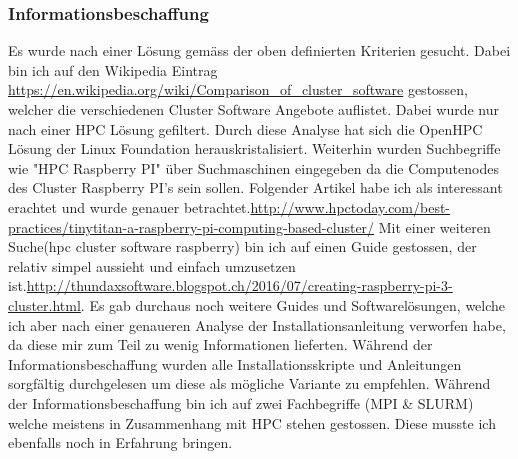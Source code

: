 \subsubsection{Informationsbeschaffung}
Es wurde nach einer Lösung gemäss der oben definierten Kriterien gesucht. Dabei bin ich auf den Wikipedia Eintrag \hyperref[Wikipedia Eintrag]{https://en.wikipedia.org/wiki/Comparison\_of\_cluster\_software} gestossen, welcher die verschiedenen Cluster Software Angebote auflistet. Dabei wurde nur nach einer HPC Lösung gefiltert. Durch diese Analyse hat sich die OpenHPC Lösung der Linux Foundation herauskristalisiert. Weiterhin wurden Suchbegriffe wie "HPC Raspberry PI" über Suchmaschinen eingegeben da die Computenodes des Cluster Raspberry PI's sein sollen. Folgender Artikel habe ich als interessant erachtet und wurde genauer betrachtet.\hyperref[TinyTitan]{http://www.hpctoday.com/best-practices/tinytitan-a-raspberry-pi-computing-based-cluster/}
Mit einer weiteren Suche(hpc cluster software raspberry) bin ich auf einen Guide gestossen, der relativ simpel aussieht und einfach umzusetzen ist.\hyperref[Eigenbau]{http://thundaxsoftware.blogspot.ch/2016/07/creating-raspberry-pi-3-cluster.html}. Es gab durchaus noch weitere Guides und Softwarelösungen, welche ich aber nach einer genaueren Analyse der Installationsanleitung verworfen habe, da diese mir zum Teil zu wenig Informationen lieferten. Während der Informationsbeschaffung wurden alle Installationsskripte und Anleitungen sorgfältig durchgelesen um diese als mögliche Variante zu empfehlen. Während der Informationsbeschaffung bin ich auf zwei Fachbegriffe (MPI \& SLURM) welche meistens in Zusammenhang mit HPC stehen gestossen. Diese musste ich ebenfalls noch in Erfahrung bringen.





